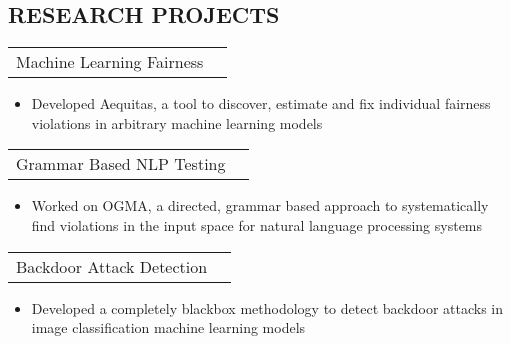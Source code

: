 \documentclass[margin]{res}
\begin{document}
\begin{resume}
\section{RESEARCH PROJECTS}      
                  \begin{tabular}{p{4.2in} r}  %
                  Machine Learning Fairness &  \\
                  \end{tabular}	
                   \begin{itemize} 
                   \item[] Developed Aequitas, a tool to discover, estimate and fix individual fairness violations in arbitrary machine learning models
                  
                     \end{itemize}
                     


\begin{tabular}{p{4.2in} r}  %
                  Grammar Based NLP Testing &  \\
                  \end{tabular}	
                   \begin{itemize} %
                   \item[] Worked on OGMA, a directed, grammar based approach to systematically find violations in the input space for natural language processing systems
                  
                     \end{itemize} 

\begin{tabular}{p{4.2in} r}  %
                  Backdoor Attack Detection &  \\
                  \end{tabular}	
                   \begin{itemize} %
                   \item[] Developed a completely blackbox methodology to detect backdoor attacks in image classification machine learning models
                  

\end{itemize}
\end{resume}
\end{document}
